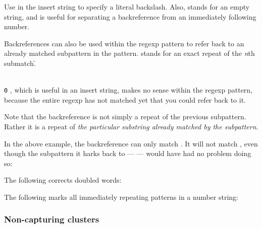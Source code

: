 {Use \p{\\} in the insert string to specify a literal
backslash.  Also, \p{\$} stands for an empty string,
and is useful for separating a backreference \p{\n}
from an immediately following number.

Backreferences can also be used within the regexp
pattern to refer back to an already matched subpattern
in the pattern.  \p{\n} stands for an exact repeat
of the {\em n}th submatch.\f{\ifx\newenvironment\PLAINTEX
\p{\0}\else
{\tt\\0}\fi
, which is useful in
an insert string, makes no  sense within the regexp
pattern, because the entire regexp has not matched yet
that you could refer back to it.} 


\n Note that the backreference is not simply a repeat
of the previous subpattern.  Rather it is a repeat of
{\em the particular  substring already matched by the
subpattern}. 

In the above example, the backreference can only match
.  It will not match , even
though the subpattern it harks back to --- \p{([a-z]+)}
---  would have had no problem doing so: 


The following corrects doubled words:


The following marks all immediately repeating patterns
in a number string:



\subsubsection{Non-capturing clusters}

}
